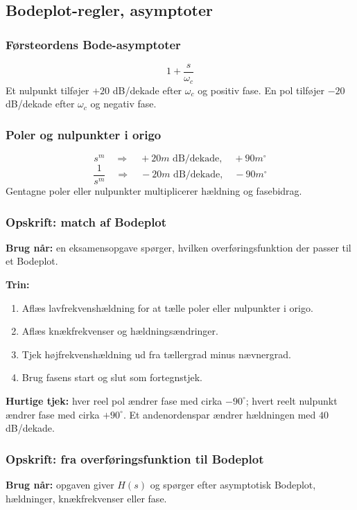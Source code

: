 \subsection{Bodeplot-regler, asymptoter}

\subsubsection{Førsteordens Bode-asymptoter}
\[
1+\frac{s}{\omega_c}
\]
Et nulpunkt tilføjer \(+20\) dB/dekade efter \(\omega_c\) og positiv fase. En pol tilføjer \(-20\) dB/dekade efter \(\omega_c\) og negativ fase.

\subsubsection{Poler og nulpunkter i origo}
\[
s^m\quad\Rightarrow\quad +20m\text{ dB/dekade},\quad +90m^\circ
\]
\[
\frac{1}{s^m}\quad\Rightarrow\quad -20m\text{ dB/dekade},\quad -90m^\circ
\]
Gentagne poler eller nulpunkter multiplicerer hældning og fasebidrag.

\subsubsection{Opskrift: match af Bodeplot}
\textbf{Brug når:} en eksamensopgave spørger, hvilken overføringsfunktion der passer til et Bodeplot.

\textbf{Trin:}
\begin{enumerate}
    \item Aflæs lavfrekvenshældning for at tælle poler eller nulpunkter i origo.
    \item Aflæs knækfrekvenser og hældningsændringer.
    \item Tjek højfrekvenshældning ud fra tællergrad minus nævnergrad.
    \item Brug fasens start og slut som fortegnstjek.
\end{enumerate}

\textbf{Hurtige tjek:} hver reel pol ændrer fase med cirka \(-90^\circ\); hvert reelt nulpunkt ændrer fase med cirka \(+90^\circ\). Et andenordenspar ændrer hældningen med \(40\) dB/dekade.

\subsubsection{Opskrift: fra overføringsfunktion til Bodeplot}
\textbf{Brug når:} opgaven giver \(H(s)\) og spørger efter asymptotisk Bodeplot, hældninger, knækfrekvenser eller fase.

